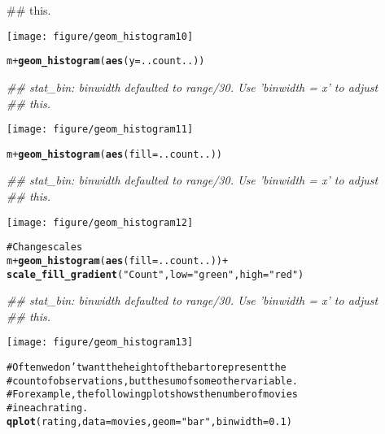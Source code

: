 \documentclass[a4paper,titlepage]{tufte-handout}\usepackage{graphicx, color}
\makeatletter
\def\maxwidth{ %
  \ifdim\Gin@nat@width>\linewidth
    \linewidth
  \else
    \Gin@nat@width
  \fi
}
\newcommand{\hlfunctioncall}[1]{\textcolor[rgb]{0.501960784313725,0,0.329411764705882}{\textbf{#1}}}%
\newcommand{\hlstring}[1]{\textcolor[rgb]{0.6,0.6,1}{#1}}%
\newcommand{\hlcomment}[1]{\textcolor[rgb]{0.180392156862745,0.6,0.341176470588235}{#1}}%
\newenvironment{kframe}{%
 \def\at@end@of@kframe{}%
 \ifinner\ifhmode%
  \def\at@end@of@kframe{\end{minipage}}%
  \begin{minipage}{\columnwidth}%
 \fi\fi%
 \def\FrameCommand##1{\hskip\@totalleftmargin \hskip-\fboxsep
 \colorbox{shadecolor}{##1}\hskip-\fboxsep
     \hskip-\linewidth \hskip-\@totalleftmargin \hskip\columnwidth}%
 \MakeFramed {\advance\hsize-\width
   \@totalleftmargin\z@ \linewidth\hsize
   \@setminipage}}%
 {\par\unskip\endMakeFramed%
 \at@end@of@kframe}
\newenvironment{knitrout}{}{} %
\makeatother
\begin{document}
\begin{knitrout}
\begin{kframe}
\begin{flushleft}
{\#\# this.}\end{flushleft}\end{kframe}\texttt{[image: figure/geom\_histogram10]} \begin{kframe}\begin{alltt}
m + \hlfunctioncall{geom_histogram}(\hlfunctioncall{aes}(y = ..count..))
\end{alltt}
\begin{flushleft}\ttfamily\noindent\itshape\textcolor{messagecolor}{\#\# stat\_bin: binwidth defaulted to range/30. Use 'binwidth = x' to adjust \\ 
\#\# this.}\end{flushleft}\end{kframe}\texttt{[image: figure/geom\_histogram11]} \begin{kframe}\begin{alltt}
m + \hlfunctioncall{geom_histogram}(\hlfunctioncall{aes}(fill = ..count..))
\end{alltt}
\begin{flushleft}\ttfamily\noindent\itshape\textcolor{messagecolor}{\#\# stat\_bin: binwidth defaulted to range/30. Use 'binwidth = x' to adjust \\ 
\#\# this.}\end{flushleft}\end{kframe}\texttt{[image: figure/geom\_histogram12]} \begin{kframe}\begin{alltt}
\hlcomment{# Change scales}
m + \hlfunctioncall{geom_histogram}(\hlfunctioncall{aes}(fill = ..count..)) +
  \hlfunctioncall{scale_fill_gradient}(\hlstring{"Count"}, low = \hlstring{"green"}, high = \hlstring{"red"})
\end{alltt}
\begin{flushleft}\ttfamily\noindent\itshape\textcolor{messagecolor}{\#\# stat\_bin: binwidth defaulted to range/30. Use 'binwidth = x' to adjust \\ 
\#\# this.}\end{flushleft}\end{kframe}\texttt{[image: figure/geom\_histogram13]} \begin{kframe}\begin{alltt}
\hlcomment{# Often we don't want the height of the bar to represent the}
\hlcomment{# count of observations, but the sum of some other variable.}
\hlcomment{# For example, the following plot shows the number of movies}
\hlcomment{# in each rating.}
\hlfunctioncall{qplot}(rating, data=movies, geom=\hlstring{"bar"}, binwidth = 0.1)

\end{alltt}
\end{kframe}
\end{knitrout}
\end{document}
